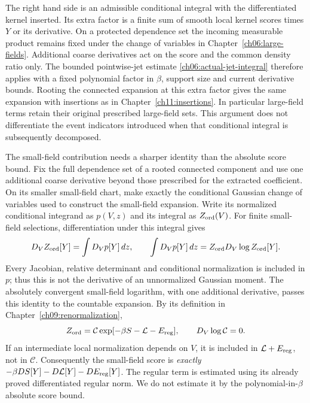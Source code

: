 The right hand side is an admissible conditional integral with the differentiated kernel inserted.
Its extra factor is a finite sum of smooth local kernel scores times
$Y$ or its derivative. On a protected dependence set the incoming
measurable product remains fixed under the change of variables in
Chapter~\ref{ch06:large-fields}. Additional coarse derivatives act
on the score and the common density ratio only. The bounded pointwise-jet estimate
\eqref{ch06:actual-jet-integral} therefore applies with a fixed
polynomial factor in $\beta$, support size and current derivative bounds.
Rooting the connected expansion at this extra factor gives the same
expansion with insertions as in Chapter~\ref{ch11:insertions}. In particular
large-field terms retain their original prescribed large-field sets.
This argument does not differentiate the event indicators introduced when that
conditional integral is subsequently decomposed.

The small-field contribution needs a sharper identity than the absolute
score bound. Fix the full dependence set of a rooted connected component and use one
additional coarse derivative beyond those prescribed for the extracted
coefficient. On its smaller small-field chart, make exactly the conditional
Gaussian change of variables used to construct the small-field expansion.
Write its normalized conditional integrand as $p(V,z)$ and its integral
as $Z_{\rm ord}(V)$. For finite small-field selections, differentiation
under this integral gives
\[
 D_VZ_{\rm ord}[Y]=\int D_Vp[Y]\,dz,
 \qquad
 \int D_Vp[Y]\,dz
 =Z_{\rm ord}D_V\log Z_{\rm ord}[Y].
\]
Every Jacobian, relative determinant and conditional normalization is
included in $p$; thus this is not the derivative of an unnormalized
Gaussian moment. The absolutely convergent small-field logarithm, with
one additional derivative, passes this identity to the countable expansion.
By its definition in Chapter~\ref{ch09:renormalization},
\[
 Z_{\rm ord}=\mathcal C
       \exp[-\beta S-\mathcal L-E_{\rm reg}],
 \qquad D_V\log\mathcal C=0.
\]
If an intermediate local normalization depends on $V$, it is included
in $\mathcal L+E_{\rm reg}$, not in $\mathcal C$. Consequently the
small-field score is \emph{exactly}
$-\beta DS[Y]-D\mathcal L[Y]-DE_{\rm reg}[Y]$.
The regular term is estimated using its already proved differentiated
regular norm. We do not estimate it by the polynomial-in-$\beta$
absolute score bound.

